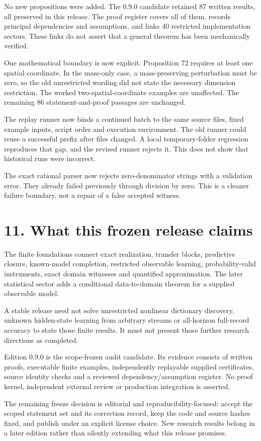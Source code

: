 \documentclass[11pt,letterpaper]{article}
\begin{document}
No new propositions were added. The 0.9.0 candidate retained 87 written
results, all preserved in this release. The proof register covers all of
them, records principal dependencies and assumptions, and links 40
restricted implementation sectors. These links do not assert that a
general theorem has been mechanically verified.

One mathematical boundary is now explicit. Proposition 72 requires at
least one spatial coordinate. In the mass-only case, a mass-preserving
perturbation must be zero, so the old unrestricted wording did not state
the necessary dimension restriction. The worked two-spatial-coordinate
examples are unaffected. The remaining 86 statement-and-proof passages
are unchanged.

The replay runner now binds a continued batch to the same source files,
fixed example inputs, script order and execution environment. The old
runner could reuse a successful prefix after files changed. A local
temporary-folder regression reproduces that gap, and the revised runner
rejects it. This does not show that historical runs were incorrect.

The exact rational parser now rejects zero-denominator strings with a
validation error. They already failed previously through division by
zero. This is a cleaner failure boundary, not a repair of a false
accepted witness.

\section{11. What this frozen release
claims}\label{what-this-frozen-release-claims}

The finite foundations connect exact realization, transfer blocks,
predictive closure, known-model completion, restricted observable
learning, probability-valid instruments, exact domain witnesses and
quantified approximation. The later statistical sector adds a
conditional data-to-domain theorem for a supplied observable model.

A stable release need not solve unrestricted nonlinear dictionary
discovery, unknown hidden-state learning from arbitrary streams or
all-horizon full-record accuracy to state those finite results. It must
not present those further research directions as completed.

Edition 0.9.0 is the scope-frozen audit candidate. Its evidence consists
of written proofs, executable finite examples, independently replayable
supplied certificates, source identity checks and a reviewed
dependency/assumption register. No proof kernel, independent external
review or production integration is asserted.

The remaining freeze decision is editorial and reproducibility-focused:
accept the scoped statement set and its correction record, keep the code
and source hashes fixed, and publish under an explicit license choice.
New research results belong in a later edition rather than silently
extending what this release promises.
\end{document}
